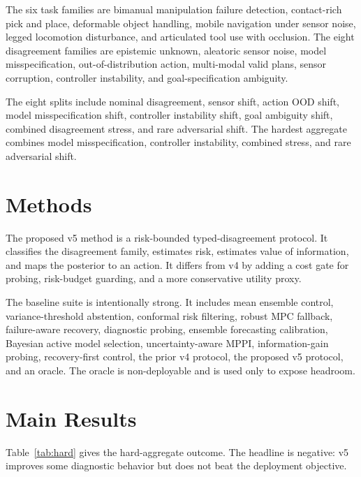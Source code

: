 \documentclass[11pt]{article}
\begin{document}
The six task families are bimanual manipulation failure detection, contact-rich pick and place, deformable object handling, mobile navigation under sensor noise, legged locomotion disturbance, and articulated tool use with occlusion. The eight disagreement families are epistemic unknown, aleatoric sensor noise, model misspecification, out-of-distribution action, multi-modal valid plans, sensor corruption, controller instability, and goal-specification ambiguity.

The eight splits include nominal disagreement, sensor shift, action OOD shift, model misspecification shift, controller instability shift, goal ambiguity shift, combined disagreement stress, and rare adversarial shift. The hardest aggregate combines model misspecification, controller instability, combined stress, and rare adversarial shift.

\section{Methods}
The proposed v5 method is a risk-bounded typed-disagreement protocol. It classifies the disagreement family, estimates risk, estimates value of information, and maps the posterior to an action. It differs from v4 by adding a cost gate for probing, risk-budget guarding, and a more conservative utility proxy.

The baseline suite is intentionally strong. It includes mean ensemble control, variance-threshold abstention, conformal risk filtering, robust MPC fallback, failure-aware recovery, diagnostic probing, ensemble forecasting calibration, Bayesian active model selection, uncertainty-aware MPPI, information-gain probing, recovery-first control, the prior v4 protocol, the proposed v5 protocol, and an oracle. The oracle is non-deployable and is used only to expose headroom.

\section{Main Results}
Table~\ref{tab:hard} gives the hard-aggregate outcome. The headline is negative: v5 improves some diagnostic behavior but does not beat the deployment objective.

\begin{table}[H]
\centering
\caption{Hard-aggregate results over the hardest splits.}
\label{tab:hard}
\resizebox{\linewidth}{!}{}
\end{table}
\end{document}
